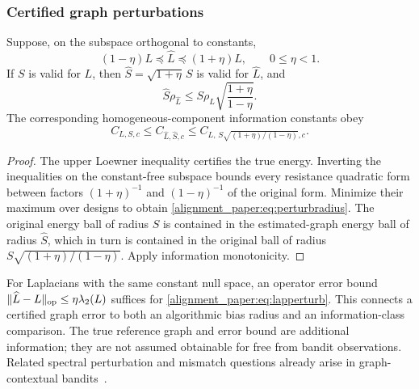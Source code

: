 \subsubsection{Certified graph perturbations}
\begin{proposition}
Suppose, on the subspace orthogonal to constants,
\begin{equation}
 (1-\eta)L\preceq\widehat L\preceq(1+\eta)L,\qquad 0\le\eta<1.
 \label{alignment_paper:eq:lapperturb}
\end{equation}
If $S$ is valid for $L$, then $\widehat S=\sqrt{1+\eta}\,S$ is valid for $\widehat L$, and
\begin{equation}
 \widehat S\rho_{\widehat L}
 \le S\rho_L\sqrt{\frac{1+\eta}{1-\eta}}.
 \label{alignment_paper:eq:perturbradius}
\end{equation}
The corresponding homogeneous-component information constants obey
\begin{equation}
 C_{L,S,c}\le C_{\widehat L,\widehat S,c}
 \le C_{L,\,S\sqrt{(1+\eta)/(1-\eta)},c}.
 \label{alignment_paper:eq:perturbinfo}
\end{equation}
\label{alignment_paper:prop:perturb}
\end{proposition}
\begin{proof}
The upper Loewner inequality certifies the true energy. Inverting the inequalities on the constant-free subspace bounds every resistance quadratic form between factors $(1+\eta)^{-1}$ and $(1-\eta)^{-1}$ of the original form. Minimize their maximum over designs to obtain \eqref{alignment_paper:eq:perturbradius}. The original energy ball of radius $S$ is contained in the estimated-graph energy ball of radius $\widehat S$, which in turn is contained in the original ball of radius $S\sqrt{(1+\eta)/(1-\eta)}$. Apply information monotonicity.
\end{proof}
For Laplacians with the same constant null space, an operator error bound
$\|\widehat L-L\|_{\rm op}\le\eta\lambda_2(L)$ suffices for \eqref{alignment_paper:eq:lapperturb}. This connects a certified graph error to both an algorithmic bias radius and an information-class comparison. The true reference graph and error bound are additional information; they are not assumed obtainable for free from bandit observations. Related spectral perturbation and mismatch questions already arise in graph-contextual bandits~\cite{collected27}.

